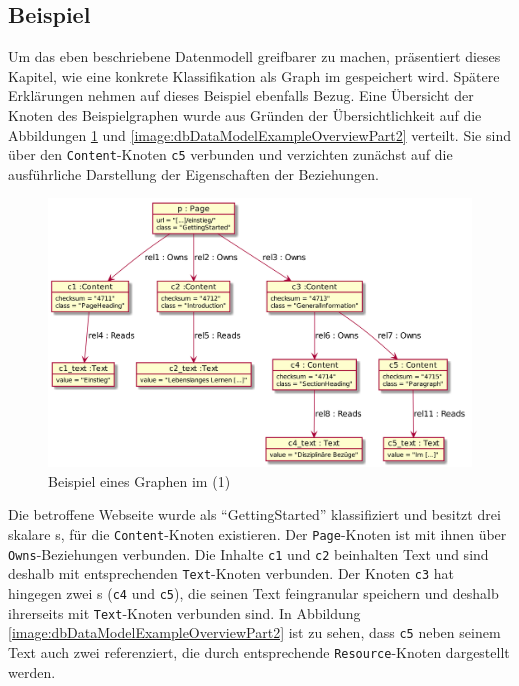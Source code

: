 \subsection{Beispiel}
    \label{section:solutionDetailPersistenceDataModelExample}
    Um das eben beschriebene Datenmodell greifbarer zu machen,
    präsentiert dieses Kapitel, wie eine konkrete Klassifikation als
    Graph im {\classificationStorage} gespeichert wird.
    Spätere Erklärungen nehmen auf dieses Beispiel ebenfalls Bezug.
    Eine Übersicht der Knoten des Beispielgraphen wurde aus Gründen
    der Übersichtlichkeit auf die Abbildungen \ref{image:dbDataModelExampleOverviewPart1}
    und \ref{image:dbDataModelExampleOverviewPart2} verteilt.
    Sie sind über den \texttt{Content}-Knoten \texttt{c5} verbunden
    und verzichten zunächst auf die ausführliche Darstellung der Eigenschaften der Beziehungen.

    \begin{figure}[htb]
        \centering
        \includegraphics[scale=\imageScalingFactor]{../resources/db-data-model/example/example_part1.png}
        \caption{Beispiel eines Graphen im {\classificationStorage} (1)}
        \label{image:dbDataModelExampleOverviewPart1}
    \end{figure}

    Die betroffene Webseite wurde als "`GettingStarted"' klassifiziert und besitzt drei skalare {\contentFeature}s,
    für die \texttt{Content}-Knoten existieren.
    Der \texttt{Page}-Knoten ist mit ihnen über \texttt{Owns}-Beziehungen verbunden.
    Die Inhalte \texttt{c1} und \texttt{c2} beinhalten Text und sind deshalb mit entsprechenden \texttt{Text}-Knoten verbunden.
    Der Knoten \texttt{c3} hat hingegen zwei {\childFeature}s (\texttt{c4} und \texttt{c5}), die seinen Text feingranular speichern
    und deshalb ihrerseits mit \texttt{Text}-Knoten verbunden sind.
    In Abbildung \ref{image:dbDataModelExampleOverviewPart2} ist zu sehen,
    dass \texttt{c5} neben seinem Text auch zwei {\resources} referenziert,
    die durch entsprechende \texttt{Resource}-Knoten dargestellt werden.

